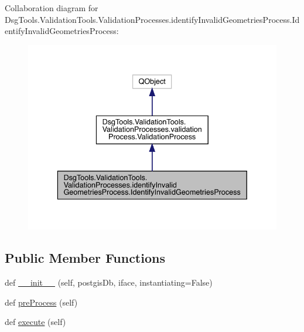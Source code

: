 Collaboration diagram for Dsg\+Tools.\+Validation\+Tools.\+Validation\+Processes.\+identify\+Invalid\+Geometries\+Process.\+Identify\+Invalid\+Geometries\+Process\+:
\nopagebreak
\begin{figure}[H]
\begin{center}
\leavevmode
\includegraphics[width=336pt]{class_dsg_tools_1_1_validation_tools_1_1_validation_processes_1_1identify_invalid_geometries_pro0f363b82f44f92cf52caf689df336e42}
\end{center}
\end{figure}
\subsection*{Public Member Functions}
\begin{DoxyCompactItemize}
\item 
def \mbox{\hyperlink{class_dsg_tools_1_1_validation_tools_1_1_validation_processes_1_1identify_invalid_geometries_pro5fada1db0a6bcf351a3763e9c36b27ae_a51c1f034cd3ebb80bd2c0213ddf34358}{\+\_\+\+\_\+init\+\_\+\+\_\+}} (self, postgis\+Db, iface, instantiating=False)
\item 
def \mbox{\hyperlink{class_dsg_tools_1_1_validation_tools_1_1_validation_processes_1_1identify_invalid_geometries_pro5fada1db0a6bcf351a3763e9c36b27ae_a7c59eea662a62e46236b1e49b541b013}{pre\+Process}} (self)
\item 
def \mbox{\hyperlink{class_dsg_tools_1_1_validation_tools_1_1_validation_processes_1_1identify_invalid_geometries_pro5fada1db0a6bcf351a3763e9c36b27ae_a32a56ddf5cd3358e8346814d482468c6}{execute}} (self)
\end{DoxyCompactItemize}
